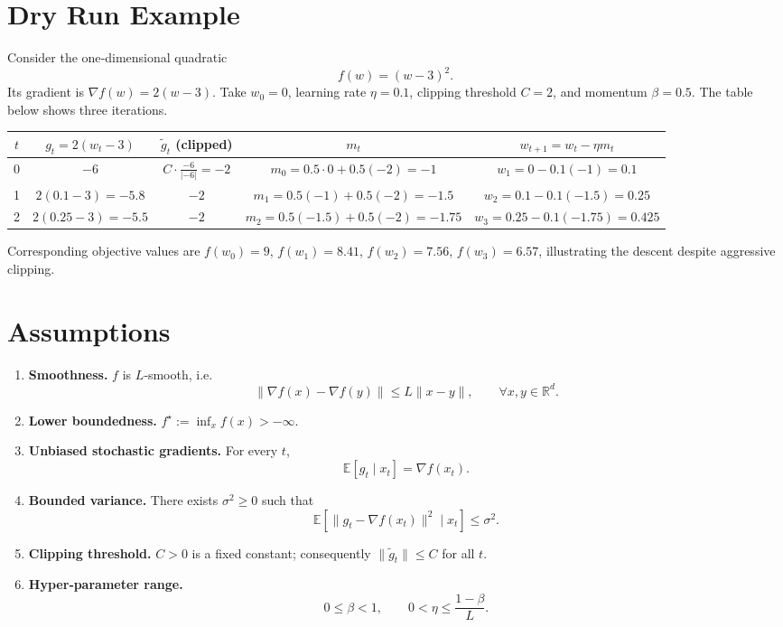 \documentclass{article}
\newcommand{\E}{\mathbb{E}}
\newcommand{\R}{\mathbb{R}}
\begin{document}
\section*{Dry Run Example}
Consider the one‑dimensional quadratic
\[
f(w)=(w-3)^2 .
\]
Its gradient is $\nabla f(w)=2(w-3)$.  
Take $w_0=0$, learning rate $\eta=0.1$, clipping threshold $C=2$, and momentum $\beta=0.5$.
The table below shows three iterations.

\begin{center}
\begin{tabular}{c|c|c|c|c}
$t$ & $g_t=2(w_t-3)$ & $\tilde g_t$ (clipped) & $m_t$ & $w_{t+1}=w_t-\eta m_t$ \\ \midrule
0 & $-6$ & $C\cdot\frac{-6}{|{-6}|}= -2$ & $m_0=0.5\cdot0+0.5(-2)=-1$ & $w_1=0-0.1(-1)=0.1$ \\ \midrule
1 & $2(0.1-3)=-5.8$ & $-2$ & $m_1=0.5(-1)+0.5(-2)=-1.5$ & $w_2=0.1-0.1(-1.5)=0.25$ \\ \midrule
2 & $2(0.25-3)=-5.5$ & $-2$ & $m_2=0.5(-1.5)+0.5(-2)=-1.75$ & $w_3=0.25-0.1(-1.75)=0.425$ \\ 
\end{tabular}
\end{center}

Corresponding objective values are $f(w_0)=9$, $f(w_1)=8.41$, $f(w_2)=7.56$, $f(w_3)=6.57$, illustrating the descent despite aggressive clipping.

\newpage

\section*{Assumptions}
\begin{enumerate}[label={A\arabic*}.]
\item \textbf{Smoothness.} $f$ is $L$‑smooth, i.e.
\[
\|\nabla f(x)-\nabla f(y)\|\le L\|x-y\|,\qquad\forall x,y\in\R^{d}.
\tag{A1}
\]
\item \textbf{Lower boundedness.} $f^\star:=\inf_{x}f(x)>-\infty$.
\item \textbf{Unbiased stochastic gradients.} For every $t$,
\[
\E\!\left[g_t\mid x_t\right]=\nabla f(x_t).
\tag{A3}
\]
\item \textbf{Bounded variance.} There exists $\sigma^2\ge0$ such that
\[
\E\!\left[\|g_t-\nabla f(x_t)\|^2\mid x_t\right]\le\sigma^2.
\tag{A4}
\]
\item \textbf{Clipping threshold.} $C>0$ is a fixed constant; consequently $\|\tilde g_t\|\le C$ for all $t$.
\item \textbf{Hyper‑parameter range.}
\[
0\le\beta<1,\qquad 0<\eta\le\frac{1-\beta}{L}.
\tag{A6}
\]
\end{enumerate}
\end{document}
